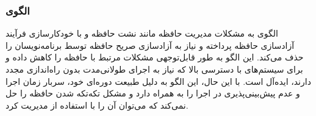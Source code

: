 \subsubsection{الگوی }
\label{memGarbCollectionSec}
\begin{RTL}
الگوی  به مشکلات
مدیریت حافظه مانند نشت حافظه و  با
خودکارسازی فرآیند آزادسازی حافظه پرداخته و نیاز به آزادسازی صریح
حافظه توسط برنامه‌نویسان را حذف می‌کند. این الگو به طور
قابل‌توجهی مشکلات مرتبط با حافظه را کاهش داده و برای سیستم‌های
با دسترسی بالا که نیاز به اجرای طولانی‌مدت بدون راه‌اندازی مجدد دارند،
ایده‌آل است. با این حال، این الگو به دلیل طبیعت دوره‌ای خود، سربار
زمان اجرا و عدم پیش‌بینی‌پذیری در اجرا را به همراه دارد و
مشکل تکه‌تکه شدن حافظه را حل نمی‌کند که می‌توان
آن را با استفاده از  مدیریت کرد.
\end{RTL}